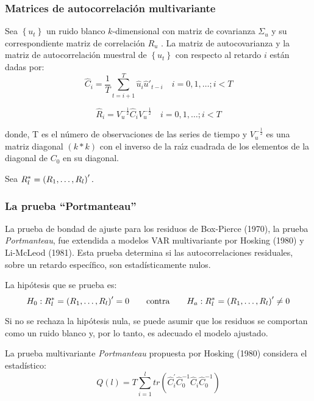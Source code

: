 \subsubsection{Matrices de autocorrelaci\'{o}n multivariante}

Sea $\left\{ u_{t} \right\}$ un ruido blanco $k$-dimensional con matriz de covarianza $\Sigma_{u}$ y su correspondiente matriz de correlaci\'{o}n $R_{u}$ . La matriz de autocovarianza y la matriz de autocorrelaci\'{o}n muestral de $\left\{ u_{t} \right\}$ con respecto al retardo $i$ est\'{a}n dadas por:
\[
\hat{C}_{i}=\frac{1}{T}\sum_{t=i+1}^T {\hat{u}_{i}{\hat{u}'}_{t-i}} \quad i= 0, 1, \ldots ; i<T
\]

\[
\hat{R}_{i}=V_{u}^{-\frac{1}{2}}\hat{C}_{i}V_{u}^{-\frac{1}{2}}\quad i= 0, 1, \ldots ; i<T
\]

donde, T es el n\'{u}mero de observaciones de las series de tiempo y $V_{u}^{-\frac{1}{2}}$ es una matriz diagonal $(k\ast k)$ con el inverso de la ra\'{\i}z cuadrada de los elementos de la diagonal de $C_{0}$ en su diagonal.\newline

Sea $R_{l}^{\ast }=\left( R_{1},\mathellipsis ,R_{l} \right)'.$

\subsubsection{La prueba ``Portmanteau''}

La prueba de bondad de ajuste para los residuos de Box-Pierce (1970), la prueba \textit{Portmanteau}, fue extendida a modelos VAR multivariante por Hosking (1980) y Li-McLeod (1981). Esta prueba determina si las autocorrelaciones residuales, sobre un retardo espec\'{i}fico, son estad\'{i}sticamente nulos.\newline

La hip\'{o}tesis que se prueba es:
\[
H_{0}:R_{l}^{\ast }=\left( R_{1},\mathellipsis ,R_{l} \right)'=0\qquad 
\text{contra}\qquad H_{a}:R_{l}^{\ast }=\left( R_{1},\mathellipsis ,R_{l} \right)'\neq 0
\]

Si no se rechaza la hip\'{o}tesis nula, se puede asumir que los residuos se comportan como un ruido blanco y, por lo tanto, es adecuado el modelo ajustado.\newline

La prueba multivariante \textit{Portmanteau} propuesta por Hosking (1980) considera el estad\'{i}stico:
\[
Q(l)=T\sum_{i=1}^l {tr\left( \hat{C}_{i}^{'}\hat{C}_{0}^{-1}\hat{C}_{i}\hat{C}_{0}^{-1} \right)} 
\]

